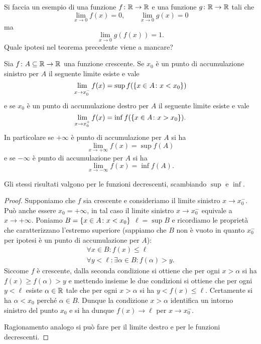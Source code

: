 \begin{exercise}
  Si faccia un esempio di una funzione $f\colon\mathbb R\to \mathbb R$ 
  e una funzione $g\colon\mathbb R\to \mathbb R$ tali che 
  \[
  \lim_{x\to 0} f(x) = 0, \qquad 
  \lim_{x\to 0} g(x) = 0
  \]
  ma
  \[
  \lim_{x\to 0} g(f(x)) = 1.
  \]
  Quale ipotesi nel teorema precedente viene a mancare?
\end{exercise}

\begin{theorem}%
  \mymark{**}%
  \label{th:limite_monotona}%
Sia $f\colon A \subseteq \mathbb R \to \mathbb R$ una funzione crescente. 
Se $x_0$ è un punto di accumulazione sinistro per $A$ 
il seguente limite esiste e vale
\[
   \lim_{x\to x_0^-}f(x) = \sup f({\left\{ x\in A\colon x<x_0 \right\}})
\]
e se $x_0$ è un punto di accumulazione destro per $A$ 
il seguente limite esiste e vale
\[
   \lim_{x\to x_0^+} f(x) = \inf f({\left\{ x\in A\colon x>x_0 \right\}}).
\]
In particolare se $+\infty$ è punto di accumulazione per $A$ 
si ha 
\[
  \lim_{x\to +\infty} f(x) = \sup f(A)
\]
e se $-\infty$ è punto di accumulazione per $A$ si ha 
\[
  \lim_{x\to -\infty} f(x) = \inf f(A).
\]

Gli stessi risultati valgono per le funzioni decrescenti, 
scambiando $\sup$ e $\inf$.
\end{theorem}
%
\begin{proof}\mymark{**}
Supponiamo che $f$ sia crescente e consideriamo il limite 
sinistro $x\to x_0^-$. Può anche essere $x_0=+\infty$, in tal 
caso il limite sinistro $x\to x_0^-$ equivale a $x\to +\infty$.
Poniamo $B={\left\{ x\in A\colon x<x_0 \right\}}$
$\ell=\sup B$ e ricordiamo le proprietà che caratterizzano 
l'estremo superiore
(sappiamo che $B$ non è vuoto in quanto $x_0^-$ per ipotesi 
è un punto di accumulazione per $A$):
\begin{gather*}
  \forall x \in B \colon f(x) \le \ell \\
  \forall y < \ell \colon \exists \alpha \in B \colon f(\alpha) > y.
\end{gather*}
Siccome $f$ è crescente, dalla seconda condizione 
si ottiene che per ogni $x>\alpha$ si ha $f(x)\ge f(\alpha)> y$
e mettendo insieme le due condizioni si ottiene che per ogni $y<\ell$
esiste $\alpha\in\mathbb R$ tale che per ogni $x>\alpha$ si ha $y<f(x)\le \ell$.
Certamente si ha $\alpha < x_0$ perché $\alpha\in B$.   
Dunque la condizione $x>\alpha$ identifica un intorno sinistro 
del punto $x_0$ e si ha dunque $f(x)\to \ell$ per $x\to x_0^-$.

Ragionamento analogo si può fare per il limite destro  
e per le funzioni decrescenti.
\end{proof}

